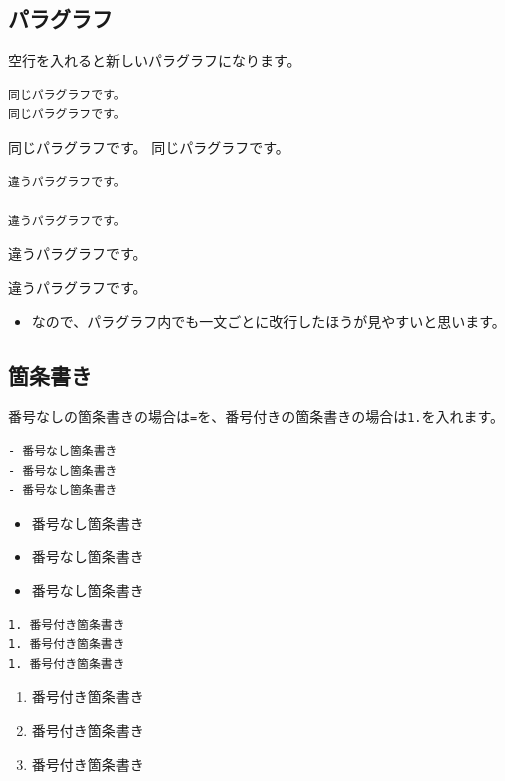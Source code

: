 \documentclass[]{bxjsreport}
\providecommand{\tightlist}{%
  \setlength{\itemsep}{0pt}\setlength{\parskip}{0pt}}
\let\asdf\section
\renewcommand{\section}{\chapter}
\let\asdff\subsection
\renewcommand{\subsection}{\asdf}
\renewcommand{\subsubsection}{\asdff}
\begin{document}
\hypertarget{ux30d1ux30e9ux30b0ux30e9ux30d5}{%
\subsubsection{パラグラフ}\label{ux30d1ux30e9ux30b0ux30e9ux30d5}}

空行を入れると新しいパラグラフになります。

\begin{verbatim}
同じパラグラフです。
同じパラグラフです。
\end{verbatim}

同じパラグラフです。
同じパラグラフです。

\begin{verbatim}
違うパラグラフです。

違うパラグラフです。
\end{verbatim}

違うパラグラフです。

違うパラグラフです。

\begin{itemize}
\tightlist
\item
  なので、パラグラフ内でも一文ごとに改行したほうが見やすいと思います。
\end{itemize}

\hypertarget{ux7b87ux6761ux66f8ux304d}{%
\subsubsection{箇条書き}\label{ux7b87ux6761ux66f8ux304d}}

番号なしの箇条書きの場合は\texttt{=}を、番号付きの箇条書きの場合は\texttt{1.}を入れます。

\begin{verbatim}
- 番号なし箇条書き
- 番号なし箇条書き
- 番号なし箇条書き
\end{verbatim}

\begin{itemize}
\tightlist
\item
  番号なし箇条書き
\item
  番号なし箇条書き
\item
  番号なし箇条書き
\end{itemize}

\begin{verbatim}
1. 番号付き箇条書き
1. 番号付き箇条書き
1. 番号付き箇条書き
\end{verbatim}

\begin{enumerate}
\def\labelenumi{\arabic{enumi}.}
\tightlist
\item
  番号付き箇条書き
\item
  番号付き箇条書き
\item
  番号付き箇条書き
\end{enumerate}
\end{document}
